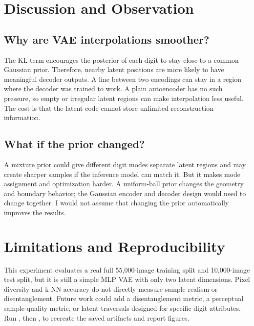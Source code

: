\documentclass[11pt,a4paper]{article}
\begin{document}
\section{Discussion and Observation}
\subsection*{Why are VAE interpolations smoother?}
The KL term encourages the posterior of each digit to stay close to a common Gaussian prior. Therefore, nearby latent positions are more likely to have meaningful decoder outputs. A line between two encodings can stay in a region where the decoder was trained to work. A plain autoencoder has no such pressure, so empty or irregular latent regions can make interpolation less useful. The cost is that the latent code cannot store unlimited reconstruction information.

\subsection*{What if the prior changed?}
A mixture prior could give different digit modes separate latent regions and may create sharper samples if the inference model can match it. But it makes mode assignment and optimization harder. A uniform-ball prior changes the geometry and boundary behavior; the Gaussian encoder and decoder design would need to change together. I would not assume that changing the prior automatically improves the results.

\section{Limitations and Reproducibility}
This experiment evaluates a real full 55,000-image training split and 10,000-image test split, but it is still a simple MLP VAE with only two latent dimensions. Pixel diversity and k-NN accuracy do not directly measure sample realism or disentanglement. Future work could add a disentanglement metric, a perceptual sample-quality metric, or latent traversals designed for specific digit attributes. Run , then , to recreate the saved artifacts and report figures.
\end{document}
